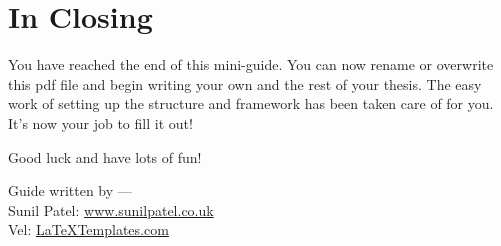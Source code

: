 
\section{In Closing}

You have reached the end of this mini-guide. You can now rename or overwrite this pdf file and begin writing your own  and the rest of your thesis. The easy work of setting up the structure and framework has been taken care of for you. It's now your job to fill it out!

Good luck and have lots of fun!

\begin{flushright}
Guide written by ---\\
Sunil Patel: \href{http://www.sunilpatel.co.uk}{www.sunilpatel.co.uk}\\
Vel: \href{http://www.LaTeXTemplates.com}{LaTeXTemplates.com}
\end{flushright}


